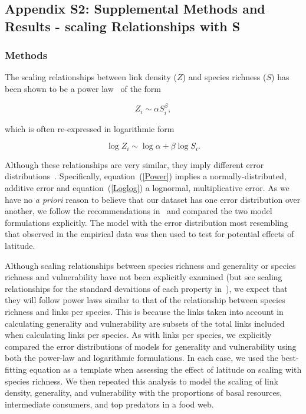 \documentclass[12pt]{article}
\begin{document}
\begin{landscape}
\end{landscape}
\newpage

\subsection*{Appendix S2: Supplemental Methods and Results - scaling Relationships with S}

  \subsubsection*{Methods}

    The scaling relationships between link density ($Z$) and species richness ($S$)
    has been shown to be a power law~\citep{Riede2010} of the form 

    \begin{equation}
    \label{Power}
    Z_{i} \sim \alpha S_{i}^{\beta}  ,
    \end{equation}

    \noindent which is often re-expressed in logarithmic form 

    \begin{equation}
    \label{Loglog}
    \log{Z_{i}} \sim \log{\alpha} + \beta\log{S_{i}}  .
    \end{equation}

    \noindent Although these relationships are very similar, they imply different error distributions~\citep{Xiao2011}.
    Specifically, equation~(\ref{Power}) implies a normally-distributed, additive error and equation~(\ref{Loglog}) a lognormal,
    multiplicative error. As we have no \emph{a priori} reason to believe that our dataset has one error distribution
    over another, we follow the recommendations in~\citet{Xiao2011} and compared the two
    model formulations explicitly. The model with the error distribution most resembling that observed in the empirical
    data was then used to test for potential effects of latitude.


    Although scaling relationships between species richness and generality or
    species richness and vulnerability have not been explicitly examined (but see scaling 
    relationships for the standard devaitions of each property in~\citet{Riede2010}), we expect that they will follow
    power laws similar to that of the relationship between species richness and links per species.
    This is because the links taken into account in calculating generality and vulnerability are subsets 
    of the total links included when calculating links per species. As with links per species, we explicitly 
    compared the error distributions of models for generality and vulnerability using
    both the power-law and logarithmic formulations. 
    In each case, we used the best-fitting equation as a template when assessing the effect of latitude on scaling with
    species richness. We then repeated this analysis 
    to model the scaling of link density, generality, 
    and vulnerability with the proportions of basal 
    resources, intermediate consumers, and top predators
    in a food web.
\end{document}
